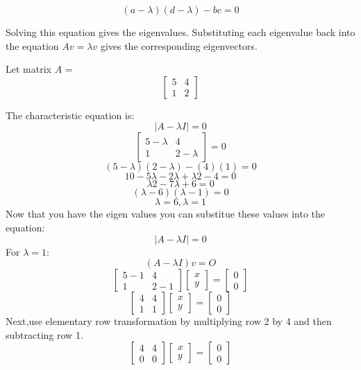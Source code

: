\begin{equation}
(a - \lambda)(d - \lambda) - bc = 0
\end{equation}

Solving this equation  gives the eigenvalues. Substituting each
eigenvalue back into the equation $Av = \lambda v$ gives the
corresponding eigenvectors.

Let matrix $A$ =
$$\begin{bmatrix}
5 & 4\\
 1 & 2 
\end{bmatrix} $$

The characteristic equation is: 
$$|A - \lambda I| = 0$$ 
$$\begin{bmatrix}
5 - \lambda & 4\\
 1 & 2- \lambda
\end{bmatrix} = 0$$
$$(5 - \lambda) (2 - \lambda) - (4)(1) = 0$$
$$10 - 5\lambda - 2\lambda + \lambda2 - 4 = 0$$
$$\lambda2 - 7\lambda + 6 = 0$$
$$(\lambda - 6)(\lambda - 1) = 0$$
$$\lambda = 6, \lambda = 1$$
Now that you have the eigen values you can substitue these values into the equation: 
$$|A - \lambda I| = 0$$ 
For $λ = 1$:
$$(A - \lambda I) v = O$$
$$\begin{bmatrix}
5-1 & 4 \\
1 & 2-1 
\end{bmatrix}
\begin{bmatrix}
x \\
y 
\end{bmatrix} = 
\begin{bmatrix}
0 \\
0 
\end{bmatrix}$$
$$\begin{bmatrix}
4 & 4\\
1 & 1 
\end{bmatrix}
\begin{bmatrix}
x  \\
y 
\end{bmatrix} = 
\begin{bmatrix}
0  \\
0 
\end{bmatrix}$$
Next,use elementary row transformation by multiplying row 2 by 4 and then subtracting row 1.
$$\begin{bmatrix}
4 & 4\\
0 & 0 
\end{bmatrix}
\begin{bmatrix}
x \\
y 
\end{bmatrix} = 
\begin{bmatrix}
0\\
0
\end{bmatrix}$$
